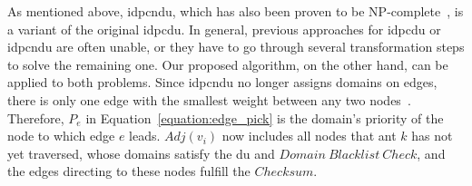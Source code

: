 As mentioned above, \acrshort{idpcndu}, which has also been proven to be NP-complete~\cite{maggi2018domain}, is a variant of the original \gls{idpcdu}. In general, previous approaches for \gls{idpcdu} or \acrshort{idpcndu} are often unable, or they have to go through several transformation steps to solve the remaining one. Our proposed algorithm, on the other hand, can be applied to both problems. Since \acrshort{idpcndu} no longer assigns domains on edges, there is only one edge with the smallest weight between any two nodes~\cite{binh2021two}. Therefore, $P_e$ in Equation~\ref{equation:edge_pick} is the domain's priority of the node to which edge $e$ leads. $Adj(v_i)$ now includes all nodes that ant $k$ has not yet traversed, whose domains satisfy the \gls{du} and $Domain~Blacklist~Check$, and the edges directing to these nodes fulfill the $Checksum$.